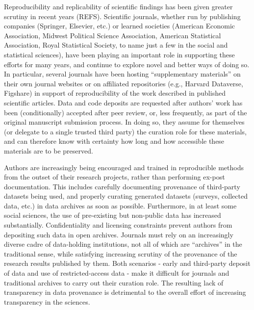 Reproducibility and replicability of scientific findings has been given greater scrutiny in recent years (REFS). Scientific journals, whether run by publishing companies (Springer, Elsevier, etc.) or learned societies (American Economic Association, Midwest Political Science Association, American Statistical Association, Royal Statistical Society, to name just a few in the social and statistical sciences), have been playing an important role in supporting these efforts for many years, and continue to explore novel and better ways of doing so. In particular, several journals have been hosting ``supplementary materials'' on their own journal websites or on affiliated repositories (e.g., Harvard Dataverse, Figshare) in support of reproducibility of the work described in published scientific articles. Data and code deposits are requested after authors' work has been (conditionally) accepted after peer review, or, less frequently, as part of the original manuscript submission process. In doing so, they assume for themselves (or delegate to a single trusted third party) the curation role for these materials, and can therefore know with certainty how long and how accessible these materials are to be preserved.

Authors are increasingly being encouraged and trained in reproducible methods from the outset of their research projects, rather than performing ex-post documentation. This includes carefully documenting provenance of third-party datasets being used, and properly curating generated datasets (surveys, collected data, etc.) in data archives as soon as possible. Furthermore, in at least some social sciences, the use of pre-existing but non-public data has increased substantially.  Confidentiality and licensing constraints prevent authors from depositing such data in open archives. Journals must rely on an increasingly diverse cadre of data-holding institutions, not all of which are ``archives'' in the traditional sense, while satisfying increasing scrutiny of the provenance of the research results published by them. Both scenarios - early and third-party deposit of data and use of restricted-access data - make it difficult for journals and traditional archives to carry out their curation role. The resulting lack of transparency in data provenance is detrimental to the overall effort of increasing transparency in the sciences.

